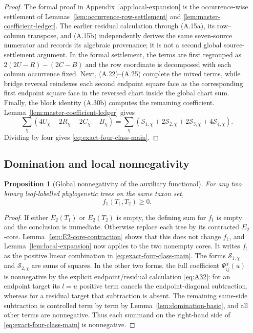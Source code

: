 \documentclass[11pt]{article}
\newtheorem{proposition}[theorem]{Proposition}
\begin{document}
\begin{proof}
The formal proof in Appendix~\ref{app:local-expansion} is the
occurrence-wise settlement of
Lemmas~\ref{lem:occurrence-row-settlement} and
\ref{lem:master-coefficient-ledger}.  The earlier residual calculation
through (A.15a), its row--column transpose, and (A.15b) independently derives
the same seven-source numerator and records its algebraic provenance; it is
not a second global source-settlement argument.  In the formal settlement,
the terms
are first regrouped as $2(2U-R)-(2C-B)$ and the row coordinate is decomposed
with each column occurrence fixed.  Next, (A.22)--(A.25) complete the mixed
terms, while bridge reversal reindexes each second endpoint square face as
the corresponding first endpoint square face in the reversed chart inside
the global chart sum.  Finally, the block identity (A.30b) computes the
remaining coefficient.  Lemma~\ref{lem:master-coefficient-ledger} gives
\[
\sum_\chi(4U_\chi-2R_\chi-2C_\chi+B_\chi)
=
\sum_\chi(\mathcal S_{1,\chi}+2\mathcal S_{2,\chi}
+2\mathcal S_{3,\chi}+4\mathcal S_{4,\chi}).
\]
Dividing by four gives \eqref{eq:exact-four-class-main}.
\end{proof}

\subsection{Domination and local nonnegativity}

\begin{proposition}[Global nonnegativity of the auxiliary functional]
\label{prop:f1-nonnegative}
For any two binary leaf-labelled phylogenetic trees on the same taxon set,
\[
f_1(T_1,T_2)\ge0.
\]
\end{proposition}

\begin{proof}
If either $E_2(T_1)$ or $E_2(T_2)$ is empty, the defining sum for $f_1$ is
empty and the conclusion is immediate.  Otherwise replace each tree by its
contracted $E_2$-core.  Lemma~\ref{lem:E2-core-contraction} shows that this
does not change $f_1$, and Lemma~\ref{lem:local-expansion} now applies to the
two nonempty cores.  It writes $f_1$ as the positive linear combination
in \eqref{eq:exact-four-class-main}.  The forms $\mathcal S_{1,\chi}$ and
$\mathcal S_{2,\chi}$ are sums of squares.  In the other two forms,
the full coefficient $\Psi_{ij}^{\chi}(u)$ is nonnegative by the explicit
endpoint/residual calculation \eqref{eq:A32}: for an endpoint target its
$l=u$ positive term cancels the endpoint-diagonal subtraction, whereas for a
residual target that subtraction is absent.  The remaining same-side
subtraction is controlled term by term by
Lemma~\ref{lem:domination-basic}, and all other terms are nonnegative.
Thus each summand on the right-hand side of
\eqref{eq:exact-four-class-main} is nonnegative.
\end{proof}
\end{document}
